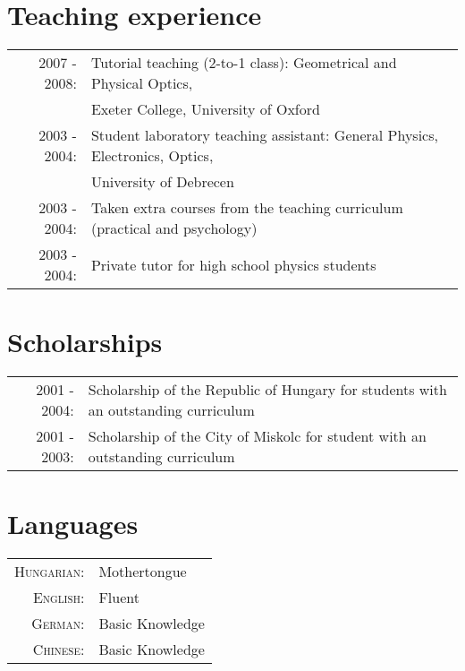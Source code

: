 \documentclass[10pt]{article}
\begin{document}
\section{Teaching experience}
\begin{tabular}{rl}
\textsc{2007 - 2008:} & Tutorial teaching (2-to-1 class): Geometrical and Physical Optics,\\& Exeter College, University of Oxford \\
\textsc{2003 - 2004:} & Student laboratory teaching assistant: General Physics, Electronics, Optics,\\& University of Debrecen \\
\textsc{2003 - 2004:} & Taken extra courses from the teaching curriculum (practical and psychology)\\
\textsc{2003 - 2004:} & Private tutor for high school physics students
\end{tabular}

\section{Scholarships}
\begin{tabular}{rl}
\textsc{2001 - 2004:} & Scholarship of the Republic of Hungary for students with an outstanding curriculum\\
\textsc{2001 - 2003:} & Scholarship of the City of Miskolc for student with an outstanding curriculum
\end{tabular}

\section{Languages}
\begin{tabular}{rl}
\textsc{Hungarian:}&Mothertongue\\
\textsc{English:}&Fluent\\
\textsc{German:}&Basic Knowledge\\
\textsc{Chinese:}&Basic Knowledge\\
\end{tabular}

\newpage
\thispagestyle{empty}



\end{document}
